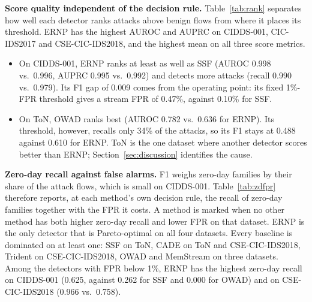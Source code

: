 \documentclass[a4paper,fleqn]{cas-dc}
\newcommand{\ERNP}{ERNP\xspace}
\begin{document}
\textbf{Score quality independent of the decision rule.} Table~\ref{tab:rank} separates how well each detector ranks attacks above benign flows from where it places its threshold. \ERNP has the highest AUROC and AUPRC on CIDDS-001, CIC-IDS2017 and CSE-CIC-IDS2018, and the highest mean on all three score metrics.
\begin{itemize}
  \item On CIDDS-001, \ERNP ranks at least as well as SSF (AUROC 0.998 vs.\ 0.996, AUPRC 0.995 vs.\ 0.992) and detects more attacks (recall 0.990 vs.\ 0.979). Its F1 gap of 0.009 comes from the operating point: its fixed 1\%-FPR threshold gives a stream FPR of 0.47\%, against 0.10\% for SSF.
  \item On ToN, OWAD ranks best (AUROC 0.782 vs.\ 0.636 for \ERNP). Its threshold, however, recalls only 34\% of the attacks, so its F1 stays at 0.488 against 0.610 for \ERNP. ToN is the one dataset where another detector scores better than \ERNP; Section~\ref{sec:discussion} identifies the cause.
\end{itemize}

\begin{table}[t]
\centering
\caption{RQ1, score quality independent of each method's decision rule: AUROC, AUPRC and attack recall at 1\% stream FPR (mean$\pm$std over five seeds, causal protocol, $B=200$). Bold: best per column within each metric.}
\label{tab:rank}
\scriptsize

\end{table}

\textbf{Zero-day recall against false alarms.} F1 weighs zero-day families by their share of the attack flows, which is small on CIDDS-001. Table~\ref{tab:zdfpr} therefore reports, at each method's own decision rule, the recall of zero-day families together with the FPR it costs. A method is marked when no other method has both higher zero-day recall and lower FPR on that dataset. \ERNP is the only detector that is Pareto-optimal on all four datasets. Every baseline is dominated on at least one: SSF on ToN, CADE on ToN and CSE-CIC-IDS2018, Trident on CSE-CIC-IDS2018, OWAD and MemStream on three datasets. Among the detectors with FPR below 1\%, \ERNP has the highest zero-day recall on CIDDS-001 (0.625, against 0.262 for SSF and 0.000 for OWAD) and on CSE-CIC-IDS2018 (0.966 vs.\ 0.758).
\end{document}
